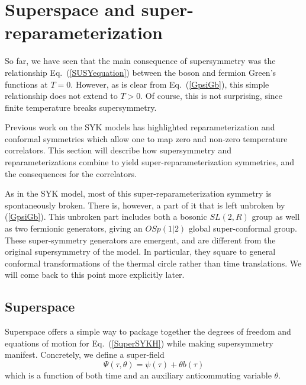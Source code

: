 \documentclass[aps,pre,preprint,onecolumn,citeautoscript,superscriptaddress,nofootinbib,eqsecnum]{revtex4-1}
\def\nref#1{(\ref{#1})}
\begin{document}
\section{Superspace and super-reparameterization} \label{sec:superspace}

So far, we have seen that the main consequence of supersymmetry was the relationship Eq.~(\ref{SUSYequation})
between the boson and fermion Green's functions at $T=0$. However, as is clear from Eq.~(\ref{GpsiGb}), this simple relationship does
not extend to $T>0$. Of course, this is not surprising, since finite temperature breaks supersymmetry. 

Previous work on the SYK models has highlighted reparameterization and conformal symmetries \cite{PG98,kitaev2015talk,SS15,JMDS16} 
which allow one to map zero and non-zero temperature correlators.
This section will describe how supersymmetry and reparameterizations combine to yield super-reparameterization symmetries,
and the consequences for the correlators. 

As in the SYK model, most of this super-reparameterization symmetry is spontaneously broken. 
There is, however, a part of it that is left unbroken by \nref{GpsiGb}. This unbroken part includes both a bosonic $SL(2,R)$ group as well 
as two fermionic generators, giving an $OSp(1|2)$ global super-conformal group. 
These super-symmetry generators are emergent, and are different from the original supersymmetry
of the model. In particular, they square to general conformal transformations of the thermal circle rather than time translations. 
We will come back to this point more explicitly later.  

\subsection{Superspace}

Superspace offers a simple way to package together the degrees of freedom and equations of motion for Eq.~(\ref{SuperSYKH})
while making supersymmetry manifest. Concretely, we define a super-field
\begin{equation}
\Psi(\tau, \theta) = \psi(\tau) + \theta b(\tau)
\end{equation}
which is a function of both time and an auxiliary anticommuting variable $\theta$. 
\end{document}
